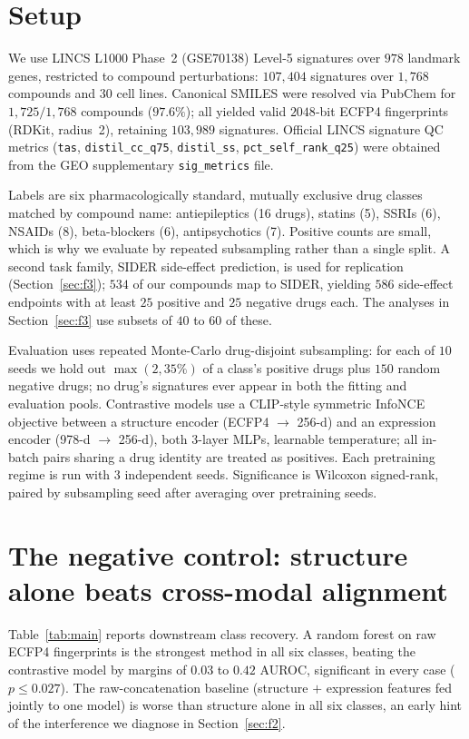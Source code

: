 \documentclass[conference]{IEEEtran}
\begin{document}
\section{Setup}
\label{sec:setup}

We use LINCS L1000 Phase~2 (GSE70138) Level-5 signatures over $978$
landmark genes, restricted to compound perturbations: $107{,}404$ signatures over
$1{,}768$ compounds and $30$ cell lines. Canonical SMILES were resolved via
PubChem for $1{,}725/1{,}768$ compounds ($97.6\%$); all yielded valid $2048$-bit
ECFP4 fingerprints (RDKit, radius~2), retaining $103{,}989$ signatures. Official
LINCS signature QC metrics (\texttt{tas}, \texttt{distil\_cc\_q75},
\texttt{distil\_ss}, \texttt{pct\_self\_rank\_q25}) were obtained from the GEO
supplementary \texttt{sig\_metrics} file.

Labels are six pharmacologically standard, mutually exclusive drug classes
matched by compound name: antiepileptics (16 drugs), statins (5), SSRIs (6),
NSAIDs (8), beta-blockers (6), antipsychotics (7). Positive counts are small,
which is why we evaluate by repeated subsampling rather than a single split. A
second task family, SIDER side-effect prediction, is used for replication
(Section~\ref{sec:f3}); $534$ of our compounds map to SIDER, yielding $586$
side-effect endpoints with at least $25$ positive and $25$ negative drugs each.
The analyses in Section~\ref{sec:f3} use subsets of $40$ to $60$ of these.

Evaluation uses repeated Monte-Carlo drug-disjoint subsampling: for each
of $10$ seeds we hold out $\max(2, 35\%)$ of a class's positive drugs plus $150$
random negative drugs; no drug's signatures ever appear in both the fitting and
evaluation pools. Contrastive models use a CLIP-style symmetric InfoNCE objective
between a structure encoder (ECFP4 $\to$ 256-d) and an expression encoder
(978-d $\to$ 256-d), both 3-layer MLPs, learnable temperature; all in-batch pairs
sharing a drug identity are treated as positives. Each pretraining regime is run
with 3 independent seeds. Significance is Wilcoxon signed-rank, paired by
subsampling seed after averaging over pretraining seeds.

\section{The negative control: structure alone beats cross-modal alignment}
\label{sec:f1}

Table~\ref{tab:main} reports downstream class recovery. A random forest on raw
ECFP4 fingerprints is the strongest method in all six classes, beating the
contrastive model by margins of $0.03$ to $0.42$ AUROC, significant in every case
($p \le 0.027$). The raw-concatenation baseline (structure $+$ expression
features fed jointly to one model) is worse than structure alone in all
six classes, an early hint of the interference we diagnose in
Section~\ref{sec:f2}.
\end{document}
